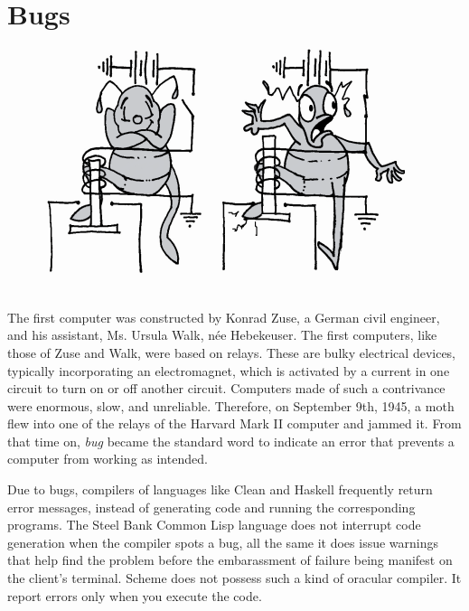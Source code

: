 \documentclass[a4paper,12pt]{book}
\begin{document}
\section{Bugs}
\begin{figure}
\includegraphics[scale=0.5]{fig-sets/bugcerto.png}
\end{figure}
The first computer was 
constructed
by Konrad Zuse,
a German civil engineer, and his assistant,
Ms. Ursula Walk, née Hebekeuser.
The first computers, like those of Zuse and Walk,
were based on relays.
These are
bulky electrical devices, typically incorporating
an electromagnet, which is activated by a current
in one circuit to turn on or off another circuit.
Computers made of such a contrivance were enormous,
slow, and unreliable. Therefore, on September 9th, 1945,
a moth flew into one of the relays of the Harvard  Mark II
computer and jammed it. From that time on,   {\em bug}
became the standard word to indicate
an error that prevents a computer from working as intended.

Due to bugs, compilers of languages like Clean
and Haskell frequently return error messages,
instead of generating code and running the
corresponding programs. The Steel Bank Common Lisp language
does not interrupt code generation when the
compiler spots a bug, all the same
it does issue warnings
that help find the problem before the embarassment
of failure being manifest on the client's terminal.
Scheme does not possess such a kind of oracular
compiler. It report errors only when you execute
the code.
\end{document}
